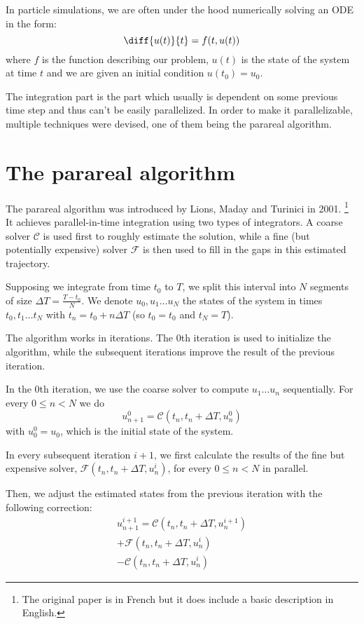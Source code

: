 \documentclass[conference]{IEEEtran}
\begin{document}
In particle simulations, we are often under the hood numerically solving an ODE in the form:
$$
\diff{u(t)}{t} = f(t, u(t))
$$
where $f$ is the function describing our problem, $u(t)$ is the state of the system at time $t$ and we are given an initial condition $u(t_0) = u_0$.

The integration part is the part which usually is dependent on some previous time step and thus can't be easily parallelized. In order to make it parallelizable, multiple techniques were devised, one of them being the parareal algorithm.

\section{The parareal algorithm}

The parareal algorithm was introduced by Lions, Maday and Turinici in 2001. \cite{parareal}\footnote{The original paper is in French but it does include a basic description in English.} It achieves parallel-in-time integration using two types of integrators. A coarse solver $\mathcal{C}$ is used first to roughly estimate the solution, while a fine (but potentially expensive) solver $\mathcal{F}$ is then used to fill in the gaps in this estimated trajectory.

Supposing we integrate from time $t_0$ to $T$, we split this interval into $N$ segments of size $\Delta T = \frac{T-t_0}{N}$. We denote $u_0, u_1\dots u_N$ the states of the system in times $t_0, t_1\dots t_N$ with $t_n = t_0 + n\Delta T$ (so $t_0 = t_0$ and $t_N = T$).

The algorithm works in iterations. The 0th iteration is used to initialize the algorithm, while the subsequent iterations improve the result of the previous iteration.

In the 0th iteration, we use the coarse solver to compute $u_1\dots u_n$ sequentially. For every $0 \leq n < N$ we do
$$
u^0_{n+1} = \mathcal{C}(t_n, t_n+\Delta T, u^0_n)
$$
with $u^0_0 = u_0$, which is the initial state of the system.

In every subsequent iteration $i+1$, we first calculate the results of the fine but expensive solver, $\mathcal{F}(t_n, t_n+\Delta T, u^{i}_n)$, for every $0 \leq n < N$ in parallel.

Then, we adjust the estimated states from the previous iteration with the following correction:
\begin{multline}
u^{i+1}_{n+1} = \mathcal{C}(t_n, t_n+\Delta T, u^{i+1}_n)\\ + \mathcal{F}(t_n, t_n+\Delta T, u^i_n)\\ - \mathcal{C}(t_n, t_n+\Delta T, u^{i}_n)
\end{multline}
\end{document}
